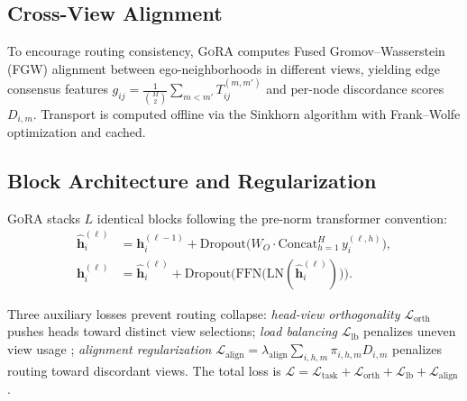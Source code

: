 \documentclass[11pt,a4paper]{article}
\newcommand{\ours}{\textsc{GoRA}}  %
\newcommand{\calL}{\mathcal{L}}
\begin{document}
\subsection{Cross-View Alignment}
\label{sec:fgw}

To encourage routing consistency, \ours{} computes Fused
Gromov--Wasserstein (FGW) \citep{vayer2019optimal} alignment between
ego-neighborhoods in different views, yielding edge consensus features
$g_{ij} = \frac{1}{\binom{M}{2}} \sum_{m < m'} T_{ij}^{(m,m')}$
and per-node discordance scores $D_{i,m}$.
Transport is computed offline via the Sinkhorn algorithm with
Frank--Wolfe optimization \citep{peyre2019computational} and cached.

\subsection{Block Architecture and Regularization}
\label{sec:block}

\ours{} stacks $L$ identical blocks following the pre-norm transformer
convention:
\begin{align}
  \hat{\mathbf{h}}_i^{(\ell)} &= \mathbf{h}_i^{(\ell-1)} +
    \mathrm{Dropout}\!\Big(
      W_O \cdot \mathrm{Concat}_{h=1}^{H}\, y_i^{(\ell, h)}
    \Big),
  \label{eq:block_attn} \\
  \mathbf{h}_i^{(\ell)} &= \hat{\mathbf{h}}_i^{(\ell)} +
    \mathrm{Dropout}\!\Big(
      \mathrm{FFN}\!\big(\mathrm{LN}(\hat{\mathbf{h}}_i^{(\ell)})\big)
    \Big).
  \label{eq:block_ffn}
\end{align}

Three auxiliary losses prevent routing collapse:
\emph{head-view orthogonality} $\calL_{\mathrm{orth}}$ pushes heads
toward distinct view selections;
\emph{load balancing} $\calL_{\mathrm{lb}}$ penalizes uneven view
usage \citep{fedus2022switch};
\emph{alignment regularization} $\calL_{\mathrm{align}} =
\lambda_{\mathrm{align}} \sum_{i,h,m} \pi_{i,h,m} D_{i,m}$
penalizes routing toward discordant views.
The total loss is
$\calL = \calL_{\mathrm{task}} + \calL_{\mathrm{orth}} +
\calL_{\mathrm{lb}} + \calL_{\mathrm{align}}$.
\end{document}
